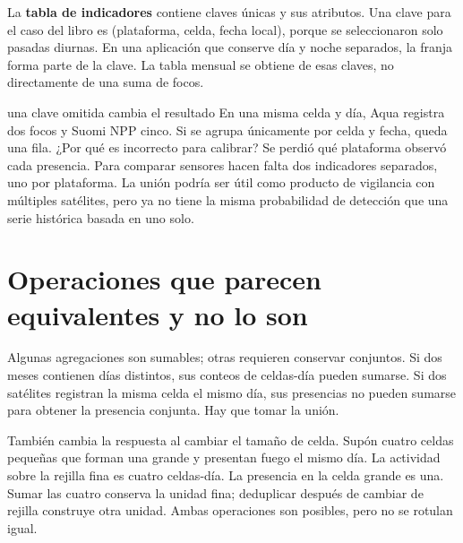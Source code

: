 La \textbf{tabla de indicadores} contiene claves únicas y sus atributos. Una clave para
el caso del libro es (plataforma, celda, fecha local), porque se seleccionaron solo
pasadas diurnas. En una aplicación que conserve día y noche separados, la franja forma
parte de la clave. La tabla mensual se obtiene de esas claves, no directamente de una
suma de focos.

\begin{ejemplo}{una clave omitida cambia el resultado}
En una misma celda y día, Aqua registra dos focos y Suomi NPP cinco. Si se agrupa únicamente
por celda y fecha, queda una fila. ¿Por qué es incorrecto para calibrar?
\solucion Se perdió qué plataforma observó cada presencia. Para comparar sensores hacen
falta dos indicadores separados, uno por plataforma. La unión podría ser útil como
producto de vigilancia con múltiples satélites, pero ya no tiene la misma probabilidad
de detección que una serie histórica basada en uno solo.
\end{ejemplo}

\FloatBarrier
\section{Operaciones que parecen equivalentes y no lo son}

Algunas agregaciones son sumables; otras requieren conservar conjuntos. Si dos meses
contienen días distintos, sus conteos de celdas-día pueden sumarse. Si dos satélites
registran la misma celda el mismo día, sus presencias no pueden sumarse para obtener
la presencia conjunta. Hay que tomar la unión.

También cambia la respuesta al cambiar el tamaño de celda. Supón cuatro celdas pequeñas
que forman una grande y presentan fuego el mismo día. La actividad sobre la rejilla fina
es cuatro celdas-día. La presencia en la celda grande es una. Sumar las cuatro conserva
la unidad fina; deduplicar después de cambiar de rejilla construye otra unidad. Ambas
operaciones son posibles, pero no se rotulan igual.

